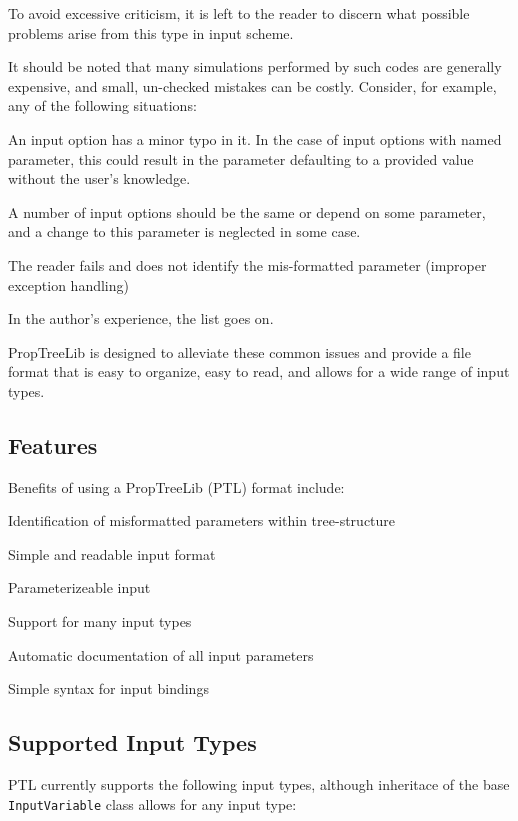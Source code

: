 \documentclass[10pt]{article}
\begin{document}
To avoid excessive criticism, it is left to the reader to discern what possible problems arise from this type in input scheme.

It should be noted that many simulations performed by such codes are generally expensive, and small, un-checked mistakes can be costly. Consider, for example, any of the following situations:

\ilist
{
	\item An input option has a minor typo in it. In the case of input options with named parameter, this could result in the parameter defaulting to a provided value without the user's knowledge.
	\item A number of input options should be the same or depend on some parameter, and a change to this parameter is neglected in some case.
	\item The reader fails and does not identify the mis-formatted parameter (improper exception handling)
}

In the author's experience, the list goes on. 

PropTreeLib is designed to alleviate these common issues and provide a file format that is easy to organize, easy to read, and allows for a wide range of input types.

\subsection*{Features}

Benefits of using a PropTreeLib (PTL) format include:

\ilist
{
	\item Identification of misformatted parameters within tree-structure
	\item Simple and readable input format
	\item Parameterizeable input
	\item Support for many input types
	\item Automatic documentation of all input parameters
	\item Simple syntax for input bindings
}

\subsection*{Supported Input Types}

PTL currently supports the following input types, although inheritace of the base \texttt{InputVariable} class allows for any input type:
\end{document}
